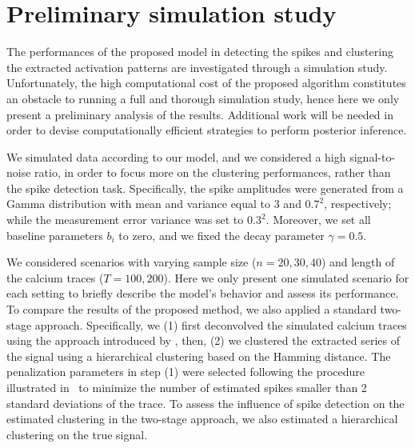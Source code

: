 \section{Preliminary simulation study}
The performances of the proposed model in detecting the spikes and clustering the extracted activation patterns are investigated through a simulation study. Unfortunately, the high computational cost of the proposed algorithm constitutes an obstacle to running a full and thorough simulation study, hence here we only present a preliminary analysis of the results. Additional work will be needed in order to devise computationally efficient strategies to perform posterior inference.

We simulated data according to our model, and we considered a high signal-to-noise ratio, in order to focus more on the clustering performances, rather than the spike detection task. Specifically, the spike amplitudes were generated from a Gamma distribution with mean and variance equal to 3 and $0.7^2$, respectively; while the measurement error variance was set to $0.3^2$. Moreover, we set all baseline parameters $b_i$ to zero, and we fixed the decay parameter $\gamma=0.5$.

We considered scenarios with varying sample size ($n = 20, 30, 40$) and length of the calcium traces ($T = 100, 200$). Here we only present one simulated scenario for each setting to briefly describe the model's behavior and assess its performance. To compare the results of the proposed method, we also applied a standard two-stage approach. Specifically, we (1) first deconvolved the simulated calcium traces using the approach introduced by \textcite{jewell2019}, then, (2) we clustered the extracted series of the signal using a hierarchical clustering based on the Hamming distance. The penalization parameters in step (1) were selected following the procedure illustrated in~\textcite{vries2020} to minimize the number of estimated spikes smaller than 2 standard deviations of the trace. To assess the influence of spike detection on the estimated clustering in the two-stage approach, we also estimated a hierarchical clustering on the true signal. 

